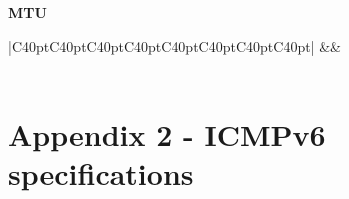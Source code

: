 \documentclass[12pt]{article}
\begin{document}
\textbf{MTU}

\begin{savenotes}
\begin{table}[!htpb]
\centering
\begin{tabular}{|C{40pt}C{40pt}C{40pt}C{40pt}C{40pt}C{40pt}C{40pt}C{40pt}|}
\hline
{}&&\\
\hline
{}\\
\hline
\end{tabular}
\caption{MTU}
\label{table:optionsMTU}
\end{table}
\end{savenotes}



\pagebreak
\section*{Appendix 2 - ICMPv6 specifications}
\label{Appendix 2}
\end{document}
